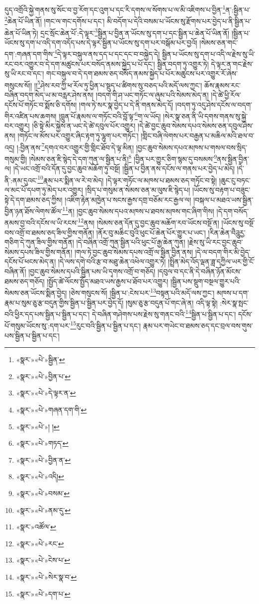 དུད་འགྲོའི་སྐྱེ་གནས་སུ་སོང་བ་བྱ་རོག་དང་འུག་པ་དང་རི་དགས་ལ་སོགས་པ་ལ་མི་འཇིགས་པ་བྱིན་\footnote{«སྣར་»«པེ་»སྦྱིན་}ན་:སྦྱིན་པ་\footnote{«སྣར་»«པེ་»བྱིན་པ་}ཆེན་པོ་ཡིན་ནོ། །གང་ལ་གང་དགོས་པ་དང་། མི་བདོག་པ་དེའི་བསམ་པ་ཡོངས་སུ་རྫོགས་པར་བྱེད་པ་ནི་སྦྱིན་པ་ཆེན་པོ་ཡིན་ཏེ། དྲང་སྲོང་ཆེན་པོ་:དེ་ལྟར་\footnote{«སྣར་»«པེ་»དེ་ལྟར་ན་}སྦྱིན་པ་བྱིན་ན་ཡོངས་སུ་དག་པ་དང་སྦྱིན་པ་ཆེན་པོ་ཡིན་ནོ། །སྦྱིན་པ་ཡོངས་སུ་དག་པ་འདི་དག་འདོད་པས་དེ་ལྟར་སྦྱིན་པ་ཡོངས་སུ་དག་པར་བསྒོམ་པར་བྱའོ། །སེམས་ཅན་གང་དག་:གཞན་དག་གིས་\footnote{«སྣར་»«པེ་»གཞན་དག་གི་}དེ་ལྟར་བསྐུལ་ནས་དད་པ་དང་དང་བ་བསྐྱེད་དེ། སྦྱིན་པ་ཡོངས་སུ་དག་པ་འདི་ལ་རྗེས་སུ་ཡི་རང་བར་འགྱུར་བ་དེ་དག་མཚུངས་པར་བསོད་ནམས་སྐྱེད་པ་པོ་དང་། སྦྱིན་བདག་ཏུ་འགྱུར་ཏེ། དེ་ལྟར་ན་གང་རྗེས་སུ་ཡི་རང་བ་དང་། གང་བསྐུལ་བ་དེ་དག་ཐམས་ཅད་བསོད་ནམས་སྐྱེད་པ་པོར་མཚུངས་པར་འགྱུར་རོ་ཞེས་གསུངས་སོ།། །།\footnote{«སྣར་»«པེ་»། །}ཤེས་རབ་ཀྱི་ཕ་རོལ་ཏུ་ཕྱིན་པ་སྡུད་པ་ཚིགས་སུ་བཅད་པའི་མདོ་ལས་ཀྱང་། ཆོས་རྣམས་རང་བཞིན་བདག་མེད་ཡ་མ་བརླར་ཤེས་ནས། །བདག་གི་ཤ་ཡང་གཏོང་ལ་ཞུམ་པའི་སེམས་མེད་ན། །དེ་ཚེ་ཕྱི་རོལ་དངོས་པོ་གཏོང་བ་སྨོས་ཅི་དགོས། །གལ་ཏེ་སར་སྣ་བྱེད་པ་དེ་ནི་གནས་མེད་དོ། །བདག་ཏུ་འདུ་ཤེས་དངོས་ལ་བདག་གིར་འཛིན་པས་ཆགས། །བླུན་པོ་རྣམས་ལ་གཏོང་བའི་བློ་ལྟ་\footnote{«སྣར་»«པེ་»གཏད་}ག་ལ་ཡོད། །སེར་སྣ་ཅན་ནི་ཡི་དགས་གནས་སུ་སྐྱེ་བར་འགྱུར། །ཅི་སྟེ་མིར་སྐྱེས་ན་ཡང་དེ་ཚེ་དབུལ་པོར་འགྱུར། །དེ་ཚེ་བྱང་ཆུབ་སེམས་དཔའ་སེམས་ཅན་དབུལ་ཤེས་ནས། །གཏོང་ལ་མོས་པར་འགྱུར་ཞིང་རྟག་ཏུ་ལྷུག་པར་གཏོང་། །གླིང་བཞི་ལེགས་པར་བརྒྱན་པ་མཆིལ་མའི་ཐལ་བ་འདྲ། །:བྱིན་ནས་\footnote{«སྣར་»«པེ་»བྱིན་ན་}དགའ་བར་འགྱུར་གྱི་གླིང་ཐོབ་དེ་ལྟ་མིན། །བྱང་ཆུབ་སེམས་དཔའ་མཁས་པ་གསལ་བས་སྲིད་གསུམ་གྱི། །སེམས་ཅན་ཇི་སྙེད་དེ་དག་ཀུན་ལ་སྦྱིན་པ་ནི།\footnote{«སྣར་»«པེ་»འདི།} །བྱིན་པར་གྱུར་ཅིག་སྙམ་དུ་བསམས་\footnote{«སྣར་»«པེ་»བསམ་}ནས་སྦྱིན་བྱིན་ལ། །དེ་ཡང་འགྲོ་བའི་དོན་དུ་བྱང་ཆུབ་མཆོག་ཏུ་བསྔོ། །སྦྱིན་པ་བྱིན་ནས་དངོས་ལ་གནས་པར་བྱེད་པ་མེད། །དེ་ནི་:ནམ་དུའང་\footnote{«སྣར་»«པེ་»ནམ་དུ་}རྣམ་པར་སྨིན་ལ་རེ་བ་མེད། །དེ་ལྟར་གཏོང་ལ་མཁས་པ་ཐམས་ཅད་གཏོང་བ་སྟེ། །ཆུང་ངུ་བཏང་ལ་མང་པོ་དཔག་ཏུ་མེད་པར་འགྱུར། །སྲིད་པ་གསུམ་ན་སེམས་ཅན་མ་ལུས་ཇི་སྙེད་པ། །ཡོངས་སུ་བརྟག་པ་བཟུང་སྟེ་དེ་དག་ཐམས་ཅད་ཀྱིས། །འཇིག་རྟེན་མཁྱེན་པ་སངས་རྒྱས་དགྲ་བཅོམ་རང་རྒྱལ་ལ། །བསྐལ་པ་མཐའ་ཡས་སྦྱིན་བྱིན་ཉན་ཐོས་ལེགས་ཚོལ་\footnote{«སྣར་»འཚོལ་}ན། །བྱང་ཆུབ་སེམས་དཔའ་མཁས་པ་ཐབས་མཁས་གང་ཞིག་གིས། །དེ་དག་བསོད་ནམས་བྱ་བའི་དངོས་ལ་ཡི་རངས་\footnote{«སྣར་»«པེ་»རང་}ནས། །སེམས་ཅན་དོན་དུ་བྱང་ཆུབ་མཆོག་རབ་ཡོངས་བསྔོ་ན། །ཡོངས་སུ་བསྔོ་བས་འགྲོ་བ་ཐམས་ཅད་ཟིལ་གྱིས་གནོན། །ནོར་བུ་མཆིང་བུའི་ཕུང་པོ་ཆེན་པོར་གྱུར་པ་ཡང་། །རིན་ཆེན་བཻཌཱུརྱ་གཅིག་དེ་ཀུན་ཟིལ་གྱིས་གནོན། །དེ་བཞིན་འགྲོ་ཀུན་སྦྱིན་པའི་ཕུང་པོ་རྒྱ་ཆེན་ཀུན། །རྗེས་སུ་ཡི་རང་བྱང་ཆུབ་སེམས་དཔས་ཟིལ་གྱིས་གནོན། །གལ་ཏེ་བྱང་ཆུབ་སེམས་དཔས་འགྲོ་ལ་སྦྱིན་བྱིན་ནས། །དེ་ལ་བདག་གིར་མི་བྱེད་དངོས་པོ་ཕངས་མེད་ན། །དེ་ལས་དགེ་བའི་རྩ་བ་མཐུ་ཆེན་འཕེལ་འགྱུར་ཏེ། །སྤྲིན་མེད་འོད་ལྡན་ཟླ་དཀྱིལ་ཡར་གྱི་ངོ་བཞིན་ནོ། །བྱང་ཆུབ་སེམས་དཔའི་སྦྱིན་པས་ཡི་དྭགས་འགྲོ་བ་གཅོད། །དབུལ་བ་དང་ནི་དེ་བཞིན་ཉོན་མོངས་ཐམས་ཅད་གཅོད། །སྤྱོད་ཚེ་ལོངས་སྤྱོད་མཐའ་ཡས་རྒྱས་པ་ཐོབ་པར་འགྱུར། །སྦྱིན་པས་སྡུག་བསྔལ་གྱུར་པའི་སེམས་ཅན་ཡོངས་སྨིན་བྱེད། །ཅེས་གསུངས་སོ། །སྦྱིན་པ་:ངེས་པར་\footnote{«སྣར་»«པེ་»ངེས་པ་}བསྟན་པའི་མདོ་ལས་ཀྱང་། མཁས་པ་དག་རྣམ་པ་སུམ་ཅུ་རྩ་བདུན་གྱིས་སྦྱིན་པ་སྦྱིན་པར་བྱེད་དོ། །སུམ་ཅུ་རྩ་བདུན་པོ་གང་ཞེ་ན། འདི་ལྟ་སྟེ། :སེར་སྣ་སྤང་བའི་ཕྱིར་དད་པས་སྦྱིན་པ་སྦྱིན་པ་དང་། དེ་བཞིན་གཤེགས་པས་རྗེས་སུ་གནང་བའི་\footnote{«སྣར་»«པེ་»སེར་སྣ་བ་}སྦྱིན་པ་སྦྱིན་པ་དང་། དངོས་པོ་གསུམ་ཡོངས་སུ་:དག་པར་\footnote{«སྣར་»«པེ་»དག་པ་}རུང་བའི་སྦྱིན་པ་སྦྱིན་པ་དང་། རྣམ་པར་གཡེང་བ་ཐམས་ཅད་དང་བྲལ་བས་གུས་པས་སྦྱིན་པ་སྦྱིན་པ་དང་། 